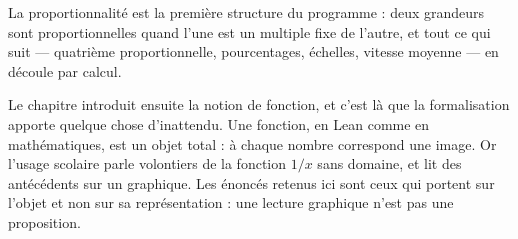 La proportionnalité est la première structure du programme : deux grandeurs sont
proportionnelles quand l'une est un multiple fixe de l'autre, et tout ce qui suit — quatrième
proportionnelle, pourcentages, échelles, vitesse moyenne — en découle par calcul.

Le chapitre introduit ensuite la notion de fonction, et c'est là que la formalisation apporte
quelque chose d'inattendu. Une fonction, en Lean comme en mathématiques, est un objet total :
à chaque nombre correspond une image. Or l'usage scolaire parle volontiers de \og{} la
fonction $1/x$ \fg{} sans domaine, et lit des antécédents sur un graphique. Les énoncés
retenus ici sont ceux qui portent sur l'objet et non sur sa représentation : une lecture
graphique n'est pas une proposition.
